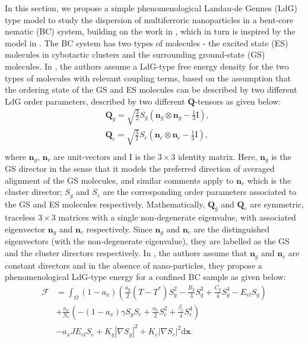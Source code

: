 \documentclass[reprint,amsfonts,amsmath,amssymb,aps,pre,floatfix,10pt]{revtex4-1}
\newcommand\dd{\mathrm{d}}
\newcommand\x{\mathbf{x}}
\newcommand\n{\mathbf{n}}
\newcommand\Q{\mathbf{Q}}
\begin{document}
In this section, we propose a simple phenomenological Landau-de Gennes (LdG) type model to study the dispersion of
multiferroric nanoparticles in a bent-core nematic (BC) system, building on the work in \cite{patranabish2019one_37}, which in turn is inspired by the model in \cite{madhusudana2017two_36}. The BC system has two types of molecules - the excited state (ES) molecules in cybotactic clusters and the surrounding ground-state (GS) molecules. In \cite{patranabish2019one_37}, the authors assume a LdG-type free energy density for the two types of molecules with relevant coupling terms, based on the assumption that the ordering state of the GS and ES molecules can be described by two different LdG order parameters, described by two different $\mathbf{Q}$-tensors as given below:
\begin{equation} \label{eq:Q}
\begin{aligned}
& \Q_g = \sqrt{\frac{3}{2} } S_g \left( \n_g \otimes \n_g - \frac{1}{3} \mathrm{I} \right), \\
& \Q_c =   \sqrt{\frac{3}{2} } S_c \left( \n_c \otimes \n_c - \frac{1}{3} \mathrm{I} \right), \\
\end{aligned}
\end{equation} where $\n_g$, $\n_c$ are unit-vectors and $\mathrm{I}$ is the $3\times 3$ identity matrix.
Here, $\n_g$ is the GS director in the sense that it models the preferred direction of averaged alignment of the GS molecules, and similar comments apply to $\n_c$ which is the cluster director; $S_g$ and $S_c$ are the corresponding order parameters associated to the GS and ES molecules respectively. Mathematically, $\Q_g$ and $\Q_c$ are symmetric, traceless $3\times 3$ matrices with a single non-degenerate eigenvalue, with associated eigenvector $\n_g$ and $\n_c$ respectively. Since $\n_g$ and $\n_c$ are the distinguished eigenvectors (with the non-degenerate eigenvalue), they are labelled as the GS and the cluster directors respectively.  In \cite{patranabish2019one_37}, the authors assume that $\n_g$ and $\n_c$ are constant directors and in the absence of nano-particles, they propose a phenomenological LdG-type energy for a confined BC sample as given below:
\begin{equation}\label{Energy1}
 \begin{aligned}
   \mathcal{F} & =  \int_{\Omega} (1 - a_x) \left( \frac{a_g}{2}(T - T^{*})S_g^2 - \frac{B_g}{3} S_g^3 + \frac{C_g}{4} S_g^4 - E_{el} S_g    \right) \\
   & + \frac{a_x}{N_c} \left( - (1 - a_x) \gamma S_g S_c + \frac{\alpha_c}{2} S_c^2 + \frac{\beta_c}{4} S_c^4  \right) \\
   & - a_xJ E_{el} S_c  + K_g |\nabla S_g|^2 + K_c |\nabla S_c|^2 \dd \x.  \\
   \end{aligned}
\end{equation}
\end{document}
